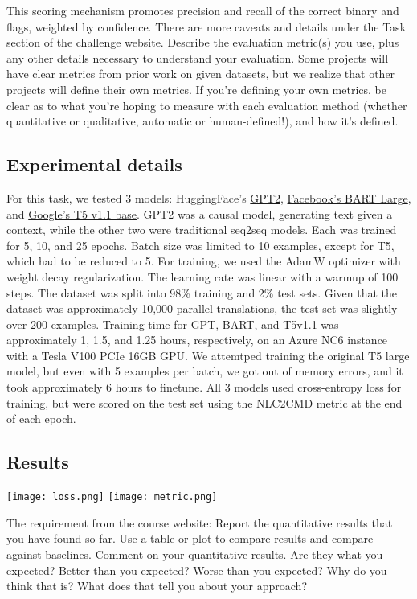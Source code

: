 \documentclass{article}
\begin{document}
This scoring mechanism promotes precision and recall of the correct binary and
flags, weighted by confidence. There are more caveats and details under the
Task section of the challenge website.
Describe the evaluation metric(s) you use, plus any other details necessary to understand your evaluation.
Some projects will have clear metrics from prior work on given datasets, but we realize that other projects will define their own metrics.
If you're defining your own metrics, be clear as to what you're hoping to measure with each evaluation method (whether quantitative or qualitative, automatic or human-defined!), and how it's defined.

\subsection{Experimental details}
For this task, we tested 3 models: HuggingFace's
\href{https://huggingface.co/gpt2}{GPT2}\cite{gpt2},
\href{https://huggingface.co/facebook/bart-large}{Facebook's BART
	Large}\cite{bart}, and \href{https://huggingface.co/google/t5-v1_1-base}{Google's T5 v1.1
	base}. GPT2 was a causal model, generating text given a context, while the
other two were traditional seq2seq models. Each was trained for 5, 10, and 25
epochs. Batch size was limited to 10 examples, except for T5, which had to be
reduced to 5. For training, we used the AdamW optimizer with weight decay
regularization. The learning rate was linear with a warmup of 100 steps. The
dataset was split into 98\% training and 2\% test sets. Given that the
dataset was approximately 10,000 parallel translations, the test set was
slightly over 200 examples. Training time for GPT, BART, and T5v1.1 was
approximately 1, 1.5, and 1.25 hours, respectively, on an Azure NC6 instance
with a Tesla V100 PCIe 16GB GPU. We attemtped training the original T5 large
model, but even with 5 examples per batch, we got out of memory errors, and
it took approximately 6 hours to finetune. All 3 models used cross-entropy
loss for training, but were scored on the test set using the NLC2CMD metric
at the end of each epoch.

\color{red}
\subsection{Results}
\color{black}

\begin{center}
	\texttt{[image: loss.png]}
	\texttt{[image: metric.png]}
\end{center}
The requirement from the course website: Report the quantitative results that you have found so far. Use a table or plot to compare results and compare against baselines.
Comment on your quantitative results. Are they what you expected? Better than you expected? Worse than you expected? Why do you think that is? What does that tell you about your approach?
\end{document}
